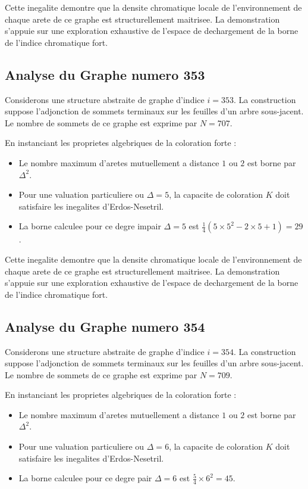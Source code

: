 \documentclass[11pt,a4paper]{article}
\begin{document}
Cette inegalite demontre que la densite chromatique locale de l'environnement de chaque arete de ce graphe est structurellement maitrisee. La demonstration s'appuie sur une exploration exhaustive de l'espace de dechargement de la borne de l'indice chromatique fort.

\subsection{Analyse du Graphe numero 353}
Considerons une structure abstraite de graphe d'indice $i = 353$. La construction suppose l'adjonction de sommets terminaux sur les feuilles d'un arbre sous-jacent. Le nombre de sommets de ce graphe est exprime par $N = 707$.

En instanciant les proprietes algebriques de la coloration forte :
\begin{itemize}
\item Le nombre maximum d'aretes mutuellement a distance $1$ ou $2$ est borne par $\Delta^2$.
\item Pour une valuation particuliere ou $\Delta = 5$, la capacite de coloration $K$ doit satisfaire les inegalites d'Erdos-Nesetril.
\item La borne calculee pour ce degre impair $\Delta = 5$ est $\frac{1}{4}(5 \times 5^2 - 2 \times 5 + 1) = 29$.
\end{itemize}

Cette inegalite demontre que la densite chromatique locale de l'environnement de chaque arete de ce graphe est structurellement maitrisee. La demonstration s'appuie sur une exploration exhaustive de l'espace de dechargement de la borne de l'indice chromatique fort.

\subsection{Analyse du Graphe numero 354}
Considerons une structure abstraite de graphe d'indice $i = 354$. La construction suppose l'adjonction de sommets terminaux sur les feuilles d'un arbre sous-jacent. Le nombre de sommets de ce graphe est exprime par $N = 709$.

En instanciant les proprietes algebriques de la coloration forte :
\begin{itemize}
\item Le nombre maximum d'aretes mutuellement a distance $1$ ou $2$ est borne par $\Delta^2$.
\item Pour une valuation particuliere ou $\Delta = 6$, la capacite de coloration $K$ doit satisfaire les inegalites d'Erdos-Nesetril.
\item La borne calculee pour ce degre pair $\Delta = 6$ est $\frac{5}{4} \times 6^2 = 45$.
\end{itemize}
\end{document}
